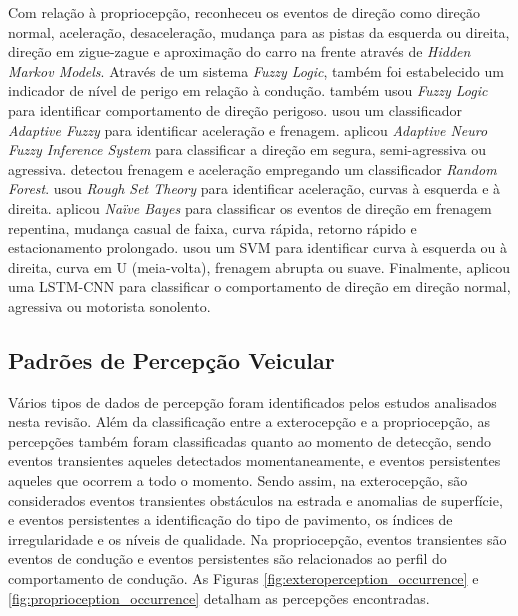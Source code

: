 Com relação à propriocepção, \cite{Wu2013} reconheceu os eventos de direção como direção normal, aceleração, desaceleração, mudança para as pistas da esquerda ou direita, direção em zigue-zague e aproximação do carro na frente através de \textit{Hidden Markov
Models}. Através de um sistema \textit{Fuzzy Logic}, também foi estabelecido um indicador de nível de perigo em relação à condução. \cite{Choudhary2014} também usou \textit{Fuzzy Logic} para identificar comportamento de direção perigoso. \cite{Arroyo2016} usou um classificador \textit{Adaptive Fuzzy} para identificar aceleração e frenagem. \cite{Eftekhari2018} aplicou \textit{Adaptive Neuro Fuzzy Inference System} para classificar a direção em segura, semi-agressiva ou agressiva. \cite{Bose2018} detectou frenagem e aceleração empregando um classificador \textit{Random Forest}. \cite{Vlahogianni2017} usou \textit{Rough Set Theory} para identificar aceleração, curvas à esquerda e à direita. \cite{Wu2018} aplicou \textit{Naïve Bayes} para classificar os eventos de direção em frenagem repentina, mudança casual de faixa, curva rápida, retorno rápido e estacionamento prolongado. \cite{Mahboob2017} usou um SVM para identificar curva à esquerda ou à direita, curva em U (meia-volta), frenagem abrupta ou suave. Finalmente, \cite{Saleh2017} aplicou uma LSTM-CNN para classificar o comportamento de direção em direção normal, agressiva ou motorista sonolento.

\subsection{Padrões de Percepção Veicular}

Vários tipos de dados de percepção foram identificados pelos estudos analisados nesta revisão. Além da classificação entre a exterocepção e a propriocepção, as percepções também foram classificadas quanto ao momento de detecção, sendo eventos transientes aqueles detectados momentaneamente, e eventos persistentes aqueles que ocorrem a todo o momento. 
Sendo assim, na exterocepção, são considerados eventos transientes obstáculos na estrada e anomalias de superfície, e eventos persistentes a identificação do tipo de pavimento, os índices de irregularidade e os níveis de qualidade. Na propriocepção, eventos transientes são eventos de condução e eventos persistentes são relacionados ao perfil do comportamento de condução. 
As Figuras \ref{fig:exteroperception_occurrence} e \ref{fig:proprioception_occurrence} detalham as percepções encontradas.

